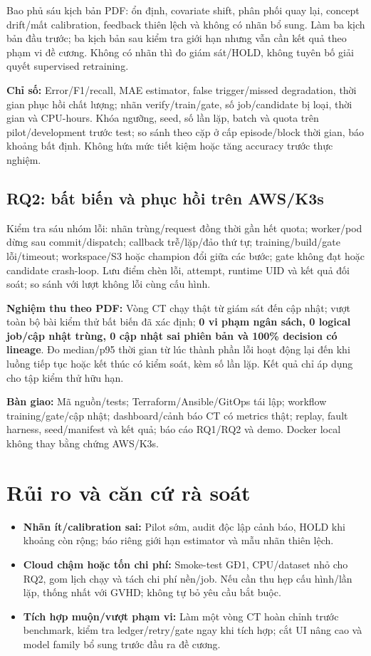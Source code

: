 \documentclass[11pt,a4paper]{article}
\begin{document}
Bao phủ sáu kịch bản PDF: ổn định, covariate shift, phân phối quay lại, concept drift/mất calibration, feedback thiên lệch và không có nhãn bổ sung. Làm ba kịch bản đầu trước; ba kịch bản sau kiểm tra giới hạn nhưng vẫn cần kết quả theo phạm vi đề cương. Không có nhãn thì đo giám sát/HOLD, không tuyên bố giải quyết supervised retraining.

\textbf{Chỉ số:} Error/F1/recall, MAE estimator, false trigger/missed degradation, thời gian phục hồi chất lượng; nhãn verify/train/gate, số job/candidate bị loại, thời gian và CPU-hours. Khóa ngưỡng, seed, số lần lặp, batch và quota trên pilot/development trước test; so sánh theo cặp ở cấp episode/block thời gian, báo khoảng bất định. Không hứa mức tiết kiệm hoặc tăng accuracy trước thực nghiệm.

\subsection{RQ2: bất biến và phục hồi trên AWS/K3s}
Kiểm tra sáu nhóm lỗi: nhãn trùng/request đồng thời gần hết quota; worker/pod dừng sau commit/dispatch; callback trễ/lặp/đảo thứ tự; training/build/gate lỗi/timeout; workspace/S3 hoặc champion đổi giữa các bước; gate không đạt hoặc candidate crash-loop. Lưu điểm chèn lỗi, attempt, runtime UID và kết quả đối soát; so sánh với lượt không lỗi cùng cấu hình.

\textbf{Nghiệm thu theo PDF:} Vòng CT chạy thật từ giám sát đến cập nhật; vượt toàn bộ bài kiểm thử bất biến đã xác định; \textbf{0 vi phạm ngân sách, 0 logical job/cập nhật trùng, 0 cập nhật sai phiên bản và 100\% decision có lineage}. Đo median/p95 thời gian từ lúc thành phần lỗi hoạt động lại đến khi luồng tiếp tục hoặc kết thúc có kiểm soát, kèm số lần lặp. Kết quả chỉ áp dụng cho tập kiểm thử hữu hạn.

\textbf{Bàn giao:} Mã nguồn/tests; Terraform/Ansible/GitOps tái lập; workflow training/gate/cập nhật; dashboard/cảnh báo CT có metrics thật; replay, fault harness, seed/manifest và kết quả; báo cáo RQ1/RQ2 và demo. Docker local không thay bằng chứng AWS/K3s.

\clearpage
\section{Rủi ro và căn cứ rà soát}
\begin{itemize}
  \item \textbf{Nhãn ít/calibration sai:} Pilot sớm, audit độc lập cảnh báo, HOLD khi khoảng còn rộng; báo riêng giới hạn estimator và mẫu nhãn thiên lệch.
  \item \textbf{Cloud chậm hoặc tốn chi phí:} Smoke-test GĐ1, CPU/dataset nhỏ cho RQ2, gom lịch chạy và tách chi phí nền/job. Nếu cần thu hẹp cấu hình/lần lặp, thống nhất với GVHD; không tự bỏ yêu cầu bắt buộc.
  \item \textbf{Tích hợp muộn/vượt phạm vi:} Làm một vòng CT hoàn chỉnh trước benchmark, kiểm tra ledger/retry/gate ngay khi tích hợp; cắt UI nâng cao và model family bổ sung trước đầu ra đề cương.
\end{itemize}
\end{document}
